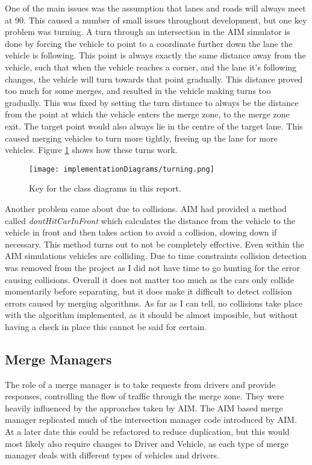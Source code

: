 One of the main issues was the assumption that lanes and roads will always meet at 90\degree. This caused a number of small issues throughout development, but one key problem was turning. A turn through an intersection in the AIM simulator is done by forcing the vehicle to point to a coordinate further down the lane the vehicle is following. This point is always exactly the same distance away from the vehicle, such that when the vehicle reaches a corner, and the lane it's following changes, the vehicle will turn towards that point gradually. This distance proved too much for some merges, and resulted in the vehicle making turns too gradually. This was fixed by setting the turn distance to always be the distance from the point at which the vehicle enters the merge zone, to the merge zone exit. The target point would also always lie in the centre of the target lane. This caused merging vehicles to turn more tightly, freeing up the lane for more vehicles. Figure \ref{fig:turning} shows how these turns work.

\begin{figure}[htb]
\texttt{[image: implementationDiagrams/turning.png]}
\caption{Key for the class diagrams in this report.}
\label{fig:turning}
\end{figure}

Another problem came about due to collisions. AIM had provided a method called \emph{dontHitCarInFront} which calculates the distance from the vehicle to the vehicle in front and then takes action to avoid a collision, slowing down if necessary. This method turns out to not be completely effective. Even within the AIM simulations vehicles are colliding. Due to time constraints collision detection was removed from the project as I did not have time to go hunting for the error causing collisions. Overall it does not matter too much as the cars only collide momentarily before separating, but it does make it difficult to detect collision errors caused by merging algorithms. As far as I can tell, no collisions take place with the algorithm implemented, as it should be almost imposible, but without having a check in place this cannot be said for certain.

\subsection{Merge Managers}
\label{subsec:Merge Managers}
The role of a merge manager is to take requests from drivers and provide responses, controlling the flow of traffic through the merge zone. They were heavily influenced by the approaches taken by AIM. The AIM based merge manager replicated much of the intersection manager code introduced by AIM. At a later date this could be refactored to reduce duplication, but this would most likely also require changes to Driver and Vehicle, as each type of merge manager deals with different types of vehicles and drivers.

